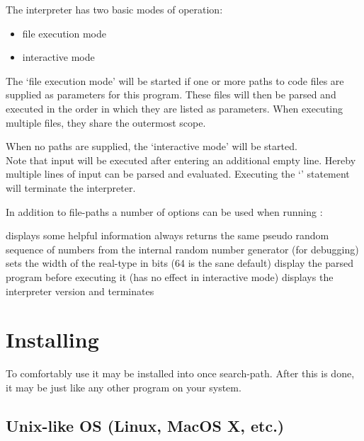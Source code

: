 The \setlX{} interpreter has two basic modes of operation:
\begin{itemize}
	\item file execution mode
	\item interactive mode
\end{itemize}

The `file execution mode' will be started if one or more paths to code files are supplied as parameters for this program. These files will then be parsed and executed in the order in which they are listed as parameters. When executing multiple files, they share the outermost scope.

When no paths are supplied, the `interactive mode' will be started.\\
Note that input will be executed after entering an additional empty line. Hereby multiple lines of input can be parsed and evaluated. Executing the `' statement will terminate the interpreter.


In addition to file-paths a number of options can be used when running \setlX{}:

\begin{itemize}
	      {displays some helpful information}
	      {always returns the same pseudo random sequence of numbers from the internal random number generator (for debugging)}
           {sets the width of the real-type in bits (64 is the sane default)}
           {display the parsed program before executing it (has no effect in interactive mode)}
           {displays the interpreter version and terminates}
\end{itemize}

\section{Installing}

To comfortably use \setlX{} it may be installed into once search-path. After this is done, it may be just like any other program on your system.

\subsection{Unix-like OS (Linux, MacOS X, etc.)}

